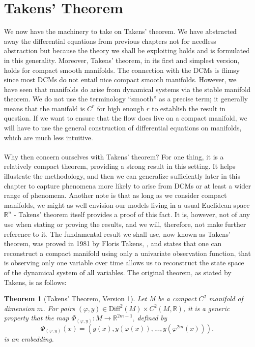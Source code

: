\documentclass[11pt, a4paper]{memoir}
\theoremstyle{break}
\newtheorem{thm}{Theorem}
\theoremstyle{break}
\theoremstyle{nonumberplain}
\newcommand{\mR}{\mathbb{R}}
\begin{document}
\section{Takens' Theorem}
We now have the machinery to take on Takens' theorem. We have abstracted away the differential equations from previous chapters not for needless abstraction but because the theory we shall be exploiting holds and is formulated in this generality. Moreover, Takens' theorem, in its first and simplest version, holds for compact smooth manifolds. The connection with the DCMs is flimsy since most DCMs do not entail nice compact smooth manifolds. However, we have seen that manifolds do arise from dynamical systems via the stable manifold theorem. We do not use the terminology \enquote{smooth} as a precise term; it generally means that the manifold is $C^r$ for high enough $r$ to establish the result in question. If we want to ensure that the flow does live on a compact manifold, we will have to use the general construction of differential equations on manifolds, which are much less intuitive.\\\\
Why then concern ourselves with Takens' theorem? For one thing, it is a relatively compact theorem, providing a strong result in this setting. It helps illustrate the methodology, and then we can generalize sufficiently later in this chapter to capture phenomena more likely to arise from DCMs or at least a wider range of phenomena. Another note is that as long as we consider compact manifolds, we might as well envision our models living in a usual Euclidean space $\mR^n$ - Takens' theorem itself provides a proof of this fact. It is, however, not of any use when stating or proving the results, and we will, therefore, not make further reference to it. The fundamental result we shall use, now known as Takens' theorem, was proved in 1981 by Floris Takens, \cite{Takens}, and states that one can reconstruct a compact manifold using only a univariate observation function, that is observing only one variable over time allows us to reconstruct the state space of the dynamical system of all variables. The original theorem, as stated by Takens, is as follows:
\begin{thm}[Takens' Theorem, Version 1]
Let M be a compact $C^2$ manifold of dimension $m$. For pairs $(\varphi,y)\in \text{Diff}^2(M)\times C^2(M,\mathbb{R})$, it is a generic property that the map $\Phi_{(\varphi,y)}:M\to \mathbb{R}^{2m+1}$, defined by
$$\Phi_{(\varphi,y)}(x)=(y(x),y(\varphi(x)),...,y(\varphi^{2m}(x))),$$
is an embedding. \cite{Takens}
\end{thm}
\end{document}
